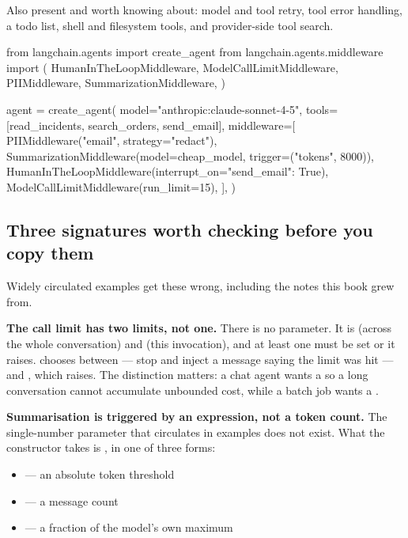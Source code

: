 \noindent
Also present and worth knowing about: model and tool retry, tool error handling,
a todo list, shell and filesystem tools, and provider-side tool search.

\begin{python}[caption={A production-shaped stack}, label={lst:stack}]
from langchain.agents import create_agent
from langchain.agents.middleware import (
    HumanInTheLoopMiddleware,
    ModelCallLimitMiddleware,
    PIIMiddleware,
    SummarizationMiddleware,
)

agent = create_agent(
    model="anthropic:claude-sonnet-4-5",
    tools=[read_incidents, search_orders, send_email],
    middleware=[
        PIIMiddleware("email", strategy="redact"),
        SummarizationMiddleware(model=cheap_model, trigger=("tokens", 8000)),
        HumanInTheLoopMiddleware(interrupt_on={"send_email": True}),
        ModelCallLimitMiddleware(run_limit=15),
    ],
)
\end{python}

\subsection{Three signatures worth checking before you copy them}
\label{sec:signature-corrections}

Widely circulated examples get these wrong, including the notes this book grew
from.

\textbf{The call limit has two limits, not one.} There is no 
parameter. It is  (across the whole conversation) and
 (this invocation), and at least one must be set or it raises.
 chooses between  --- stop and inject a message
saying the limit was hit --- and , which raises. The distinction
matters: a chat agent wants a  so a long conversation cannot
accumulate unbounded cost, while a batch job wants a .

\textbf{Summarisation is triggered by an expression, not a token count.} The
single-number parameter that circulates in examples does not exist. What the
constructor takes is , in one of three forms:

\begin{itemize}[leftmargin=1.4em,nosep]
\item {} --- an absolute token threshold
\item {} --- a message count
\item {} --- a fraction of the model's own maximum
\end{itemize}

